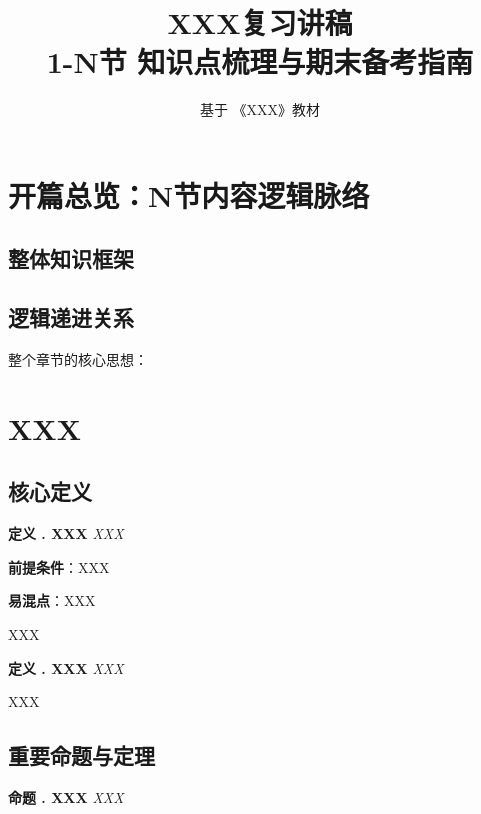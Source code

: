 \documentclass[11pt,a4paper]{article}
\title{\Large \textbf{XXX复习讲稿}\\
\normalsize 1-N节 知识点梳理与期末备考指南}
\author{\small 基于 《XXX》教材}
\date{}
\theoremstyle{plain}
\newtheorem{definition}{定义}[section]
\newtheorem{proposition}{命题}[section]
\renewenvironment{definition}[1][]
  {\par\vspace{3pt}\normalfont\textbf{定义 \thedefinition. #1}\itshape}
  {\par\vspace{2pt}}
\renewenvironment{proposition}[1][]
  {\par\vspace{3pt}\normalfont\textbf{命题 \theproposition. #1}\itshape}
  {\par\vspace{2pt}}
\begin{document}
\maketitle
\vspace{-10pt}
\tableofcontents
\vspace{-5pt}

\section{开篇总览：N节内容逻辑脉络}
\subsection{整体知识框架}

\subsection{逻辑递进关系}

\begin{logicbox}
整个章节的核心思想：
\end{logicbox}

\section{XXX}
\subsection{核心定义}
\begin{definition}[XXX]
XXX
\end{definition}

\begin{notebox}
\textbf{前提条件}：XXX
\end{notebox}

\begin{warningbox}
\textbf{易混点}：XXX

\end{warningbox}

\begin{memorybox}
XXX
\end{memorybox}

\begin{definition}[XXX]
XXX
\end{definition}

\begin{exambox}
XXX
\end{exambox}

\subsection{重要命题与定理}
\begin{proposition}[XXX]
XXX
\end{proposition}
\end{document}
